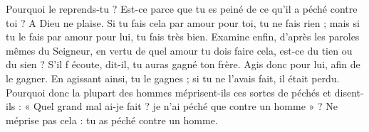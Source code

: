 Pourquoi le reprends-tu ? Est-ce parce que tu es peiné de ce qu’il a péché contre toi ? A Dieu ne plaise. Si tu fais cela par amour pour toi, tu ne fais rien ; mais si tu le fais par amour pour lui, tu fais très bien. Examine enfin, d’après les paroles mêmes du Seigneur, en vertu de quel amour tu dois faire cela, est-ce du tien ou du sien ? S'il f écoute, dit-il, tu auras gagné ton frère. Agis donc pour lui, afin de le gagner. En agissant ainsi, tu le gagnes ; si tu ne l’avais fait, il était perdu. Pourquoi donc la plupart des hommes méprisent-ils ces sortes de péchés et disent-ils : « Quel grand mal ai-je fait ? je n’ai péché que contre un homme » ? Ne méprise pas cela : tu as péché contre un homme.
